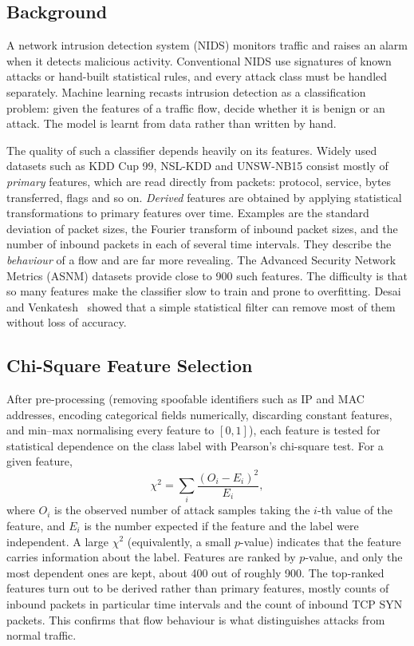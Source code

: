 \subsection{Background}
A network intrusion detection system (NIDS) monitors traffic and raises an alarm when it detects malicious activity. Conventional NIDS use signatures of known attacks or hand-built statistical rules, and every attack class must be handled separately. Machine learning recasts intrusion detection as a classification problem: given the features of a traffic flow, decide whether it is benign or an attack. The model is learnt from data rather than written by hand.

The quality of such a classifier depends heavily on its features. Widely used datasets such as KDD Cup 99, NSL-KDD and UNSW-NB15 consist mostly of \emph{primary} features, which are read directly from packets: protocol, service, bytes transferred, flags and so on. \emph{Derived} features are obtained by applying statistical transformations to primary features over time. Examples are the standard deviation of packet sizes, the Fourier transform of inbound packet sizes, and the number of inbound packets in each of several time intervals. They describe the \emph{behaviour} of a flow and are far more revealing. The Advanced Security Network Metrics (ASNM) datasets provide close to 900 such features. The difficulty is that so many features make the classifier slow to train and prone to overfitting. Desai and Venkatesh~\cite{ml_features2023} showed that a simple statistical filter can remove most of them without loss of accuracy.

\subsection{Chi-Square Feature Selection}
After pre-processing (removing spoofable identifiers such as IP and MAC addresses, encoding categorical fields numerically, discarding constant features, and min--max normalising every feature to $[0,1]$), each feature is tested for statistical dependence on the class label with Pearson's chi-square test. For a given feature,
\begin{equation}
  \chi^{2}=\sum_{i}\frac{(O_i-E_i)^{2}}{E_i},
  \label{eq:ml_chi2}
\end{equation}
where $O_i$ is the observed number of attack samples taking the $i$-th value of the feature, and $E_i$ is the number expected if the feature and the label were independent. A large $\chi^{2}$ (equivalently, a small $p$-value) indicates that the feature carries information about the label. Features are ranked by $p$-value, and only the most dependent ones are kept, about 400 out of roughly 900. The top-ranked features turn out to be derived rather than primary features, mostly counts of inbound packets in particular time intervals and the count of inbound TCP SYN packets. This confirms that flow behaviour is what distinguishes attacks from normal traffic.

